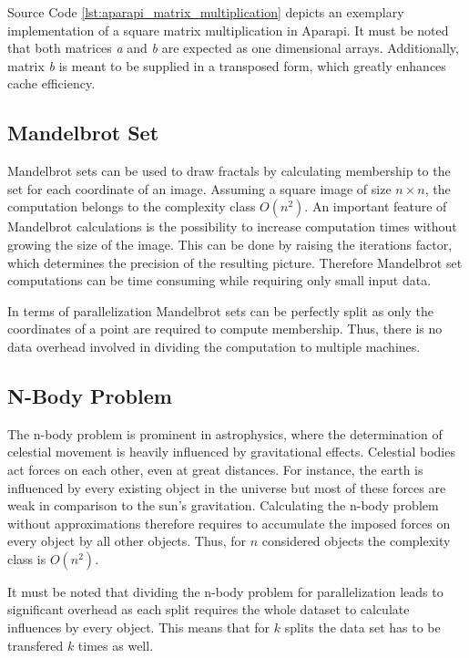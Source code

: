Source Code \ref{lst:aparapi_matrix_multiplication} depicts an exemplary implementation of a square matrix multiplication in Aparapi. It must be noted that both matrices \textit{a} and \textit{b} are expected as one dimensional arrays. Additionally, matrix \textit{b} is meant to be supplied in a transposed form, which greatly enhances cache efficiency.

\subsection*{Mandelbrot Set}

Mandelbrot sets can be used to draw fractals by calculating membership to the set for each coordinate of an image\cite{mandelbrot_article}. Assuming a square image of size $n\times n$, the computation belongs to the complexity class $O(n^2)$. An important feature of Mandelbrot calculations is the possibility to increase computation times without growing the size of the image. This can be done by raising the iterations factor, which determines the precision of the resulting picture. Therefore Mandelbrot set computations can be time consuming while requiring only small input data.

In terms of parallelization Mandelbrot sets can be perfectly split as only the coordinates of a point are required to compute membership. Thus, there is no data overhead involved in dividing the computation to multiple machines.

\subsection*{N-Body Problem}

The n-body problem is prominent in astrophysics, where the determination of celestial movement is heavily influenced by gravitational effects\cite{nbody_article}. Celestial bodies act forces on each other, even at great distances. For instance, the earth is influenced by every existing object in the universe but most of these forces are weak in comparison to the sun's gravitation. Calculating the n-body problem without approximations therefore requires to accumulate the imposed forces on every object by all other objects. Thus, for $n$ considered objects the complexity class is $O(n^2)$.

It must be noted that dividing the n-body problem for parallelization leads to significant overhead as each split requires the whole dataset to calculate influences by every object. This means that for $k$ splits the data set has to be transfered $k$ times as well.

